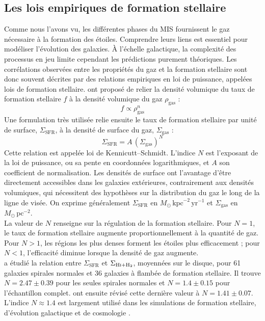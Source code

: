 \subsection{Les lois empiriques de formation stellaire}
\label{sec:sfr_ism_relationship}

Comme nous l'avons vu, les différentes phases du MIS fournissent le gaz nécessaire à la formation des étoiles. Comprendre leurs liens est essentiel pour modéliser l'évolution des galaxies. À l'échelle galactique, la complexité des processus en jeu limite cependant les prédictions purement théoriques. Les corrélations observées entre les propriétés du gaz et la formation stellaire sont donc souvent décrites par des relations empiriques en loi de puissance, appelées lois de formation stellaire.
\newpage
\indent\citet{Schmidt1959, Schmidt1963} ont proposé de relier la densité volumique du taux de formation stellaire $f$ à la densité volumique du gaz $\rho_{\mathrm{gas}}$ :
\begin{equation}
    f \propto \rho_{\mathrm{gas}}^n
\end{equation}
\noindent Une formulation très utilisée relie ensuite le taux de formation stellaire par unité de surface, $\Sigma_{\mathrm{SFR}}$, à la densité de surface du gaz, $\Sigma_{\mathrm{gas}}$ :
\begin{equation}
    \Sigma_{\mathrm{SFR}} = A\,(\Sigma_{\mathrm{gas}})^N
    \label{eq:SFLaw}
\end{equation}
\noindent Cette relation est appelée loi de Kennicutt--Schmidt. L'indice $N$ est l'exposant de la loi de puissance, ou sa pente en coordonnées logarithmiques, et $A$ son coefficient de normalisation. Les densités de surface ont l'avantage d'être directement accessibles dans les galaxies extérieures, contrairement aux densités volumiques, qui nécessitent des hypothèses sur la distribution du gaz le long de la ligne de visée. On exprime généralement $\Sigma_{\mathrm{SFR}}$ en $M_\odot\,\mathrm{kpc}^{-2}\,\mathrm{yr}^{-1}$ et $\Sigma_{\mathrm{gas}}$ en $M_\odot\,\mathrm{pc}^{-2}$.\\\indent
La valeur de $N$ renseigne sur la régulation de la formation stellaire. Pour $N = 1$, le taux de formation stellaire augmente proportionnellement à la quantité de gaz. Pour $N > 1$, les régions les plus denses forment les étoiles plus efficacement ; pour $N < 1$, l'efficacité diminue lorsque la densité de gaz augmente.\\\indent
\citet{Kennicutt1998} a étudié la relation entre $\Sigma_{\mathrm{SFR}}$ et $\Sigma_{\textrm{H\textsc{i}}+\mathrm{H}_2}$, moyennées sur le disque, pour 61 galaxies spirales normales et 36 galaxies à flambée de formation stellaire. Il trouve $N = 2.47 \pm 0.39$ pour les seules spirales normales et $N = 1.4 \pm 0.15$ pour l'échantillon complet. \citet{delosReyes2019} ont ensuite révisé cette dernière valeur à $N = 1.41 \pm 0.07$. L'indice $N \approx 1.4$ est largement utilisé dans les simulations de formation stellaire, d'évolution galactique et de cosmologie \citep{SchayetoDalla2008, FOREVER22, FLAMINGO}.\\\indent
